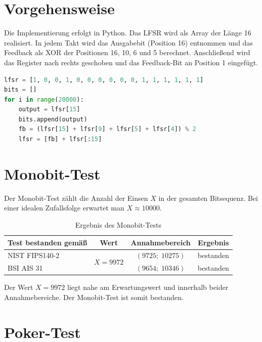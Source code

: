 \documentclass[
    fontsize=12pt,          %
    paper=a4,               %
    numbers=noenddot,       %
    listof=totoc,           %
    listof=entryprefix,     %
    listof=nochaptergap,    %
    bibliography=totoc,     %
    parskip=half,           %
    openany                 %
]{scrbook}
\begin{document}
\section*{Vorgehensweise}

Die Implementierung erfolgt in Python.
Das LFSR wird als Array der Länge 16 realisiert.
In jedem Takt wird das Ausgabebit (Position 16) entnommen und das Feedback als XOR der Positionen 16, 10, 6 und 5 berechnet.
Anschließend wird das Register nach rechts geschoben und das Feedback-Bit an Position 1 eingefügt.

\begin{lstlisting}[language=Python, caption={LFSR-Implementierung}]
lfsr = [1, 0, 0, 1, 0, 0, 0, 0, 0, 0, 1, 1, 1, 1, 1, 1]
bits = []
for i in range(20000):
    output = lfsr[15]
    bits.append(output)
    fb = (lfsr[15] + lfsr[9] + lfsr[5] + lfsr[4]) % 2
    lfsr = [fb] + lfsr[:15]
\end{lstlisting}


\section*{Monobit-Test}

Der Monobit-Test zählt die Anzahl der Einsen $X$ in der gesamten Bitsequenz.
Bei einer idealen Zufallsfolge erwartet man $X \approx 10000$.

\begin{table}[H]
    \centering
    \begin{tabular}{l c c c}
        \toprule
        \textbf{Test bestanden gemäß} & \textbf{Wert}               & \textbf{Annahmebereich} & \textbf{Ergebnis} \\
        \midrule
        NIST FIPS140-2                & \multirow{2}{*}{$X = 9972$} & $(9725;\; 10275)$       & bestanden         \\
        BSI AIS 31                    &                             & $(9654;\; 10346)$       & bestanden         \\
        \bottomrule
    \end{tabular}
    \caption{Ergebnis des Monobit-Tests}
\end{table}

Der Wert $X = 9972$ liegt nahe am Erwartungswert und innerhalb beider Annahmebereiche.
Der Monobit-Test ist somit bestanden.

\section*{Poker-Test}
\end{document}
